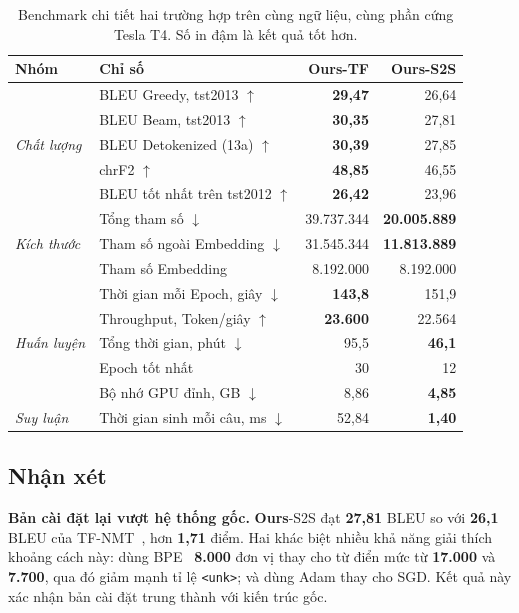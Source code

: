 \documentclass[11pt,a4paper]{article}
\newcommand{\file}[1]{\texttt{\small #1}}
\newcommand{\ours}{\textbf{Ours}}
\newcommand{\best}[1]{\textbf{#1}}
\begin{document}
\begin{table}[H]
\centering
\small
\caption{Benchmark chi tiết hai trường hợp trên cùng ngữ liệu, cùng phần cứng
Tesla T4. Số in đậm là kết quả tốt hơn.}
\label{tab:benchmark}
\begin{tabular}{ll rr}
\toprule
\textbf{Nhóm} & \textbf{Chỉ số} & \ours{}\textbf{-TF} & \ours{}\textbf{-S2S} \\
\midrule
\multirow{5}{*}{\textit{Chất lượng}}
 & BLEU Greedy, tst2013 $\uparrow$        & \best{29,47} & 26,64 \\
 & BLEU Beam, tst2013 $\uparrow$          & \best{30,35} & 27,81 \\
 & BLEU Detokenized (13a) $\uparrow$      & \best{30,39} & 27,85 \\
 & chrF2 $\uparrow$                       & \best{48,85} & 46,55 \\
 & BLEU tốt nhất trên tst2012 $\uparrow$  & \best{26,42} & 23,96 \\
\midrule
\multirow{3}{*}{\textit{Kích thước}}
 & Tổng tham số $\downarrow$              & 39.737.344 & \best{20.005.889} \\
 & Tham số ngoài Embedding $\downarrow$   & 31.545.344 & \best{11.813.889} \\
 & Tham số Embedding                      & 8.192.000  & 8.192.000 \\
\midrule
\multirow{5}{*}{\textit{Huấn luyện}}
 & Thời gian mỗi Epoch, giây $\downarrow$ & \best{143,8} & 151,9 \\
 & Throughput, Token/giây $\uparrow$      & \best{23.600} & 22.564 \\
 & Tổng thời gian, phút $\downarrow$      & 95,5 & \best{46,1} \\
 & Epoch tốt nhất                         & 30 & 12 \\
 & Bộ nhớ GPU đỉnh, GB $\downarrow$       & 8,86 & \best{4,85} \\
\midrule
\textit{Suy luận}
 & Thời gian sinh mỗi câu, ms $\downarrow$ & 52,84 & \best{1,40} \\
\bottomrule
\end{tabular}
\end{table}

\subsection{Nhận xét}

\textbf{Bản cài đặt lại vượt hệ thống gốc.} \ours{}-S2S đạt \textbf{27,81} BLEU
so với \textbf{26,1} BLEU của TF-NMT~\cite{tfnmt}, hơn \textbf{1,71} điểm. Hai
khác biệt nhiều khả năng giải thích khoảng cách này: dùng BPE~\cite{sennrich2016}
\textbf{8.000} đơn vị thay cho từ điển mức từ \textbf{17.000} và \textbf{7.700},
qua đó giảm mạnh tỉ lệ \file{<unk>}; và dùng Adam thay cho SGD. Kết quả này xác
nhận bản cài đặt trung thành với kiến trúc gốc.
\end{document}
